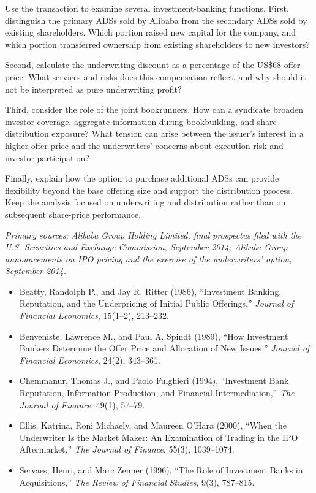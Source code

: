 Use the transaction to examine several investment-banking functions. First, distinguish the primary ADSs sold by Alibaba from the secondary ADSs sold by existing shareholders. Which portion raised new capital for the company, and which portion transferred ownership from existing shareholders to new investors?

Second, calculate the underwriting discount as a percentage of the US\$68 offer price. What services and risks does this compensation reflect, and why should it not be interpreted as pure underwriting profit?

Third, consider the role of the joint bookrunners. How can a syndicate broaden investor coverage, aggregate information during bookbuilding, and share distribution exposure? What tension can arise between the issuer's interest in a higher offer price and the underwriters' concerns about execution risk and investor participation?

Finally, explain how the option to purchase additional ADSs can provide flexibility beyond the base offering size and support the distribution process. Keep the analysis focused on underwriting and distribution rather than on subsequent share-price performance.

\emph{Primary sources: Alibaba Group Holding Limited, final prospectus filed with the U.S. Securities and Exchange Commission, September 2014; Alibaba Group announcements on IPO pricing and the exercise of the underwriters' option, September 2014.}



\begin{itemize}

\item Beatty, Randolph P., and Jay R. Ritter (1986),
``Investment Banking, Reputation, and the Underpricing of Initial Public Offerings,''
\emph{Journal of Financial Economics}, 15(1--2), 213--232.

\item Benveniste, Lawrence M., and Paul A. Spindt (1989),
``How Investment Bankers Determine the Offer Price and Allocation of New Issues,''
\emph{Journal of Financial Economics}, 24(2), 343--361.

\item Chemmanur, Thomas J., and Paolo Fulghieri (1994),
``Investment Bank Reputation, Information Production, and Financial Intermediation,''
\emph{The Journal of Finance}, 49(1), 57--79.

\item Ellis, Katrina, Roni Michaely, and Maureen O'Hara (2000),
``When the Underwriter Is the Market Maker: An Examination of Trading in the IPO Aftermarket,''
\emph{The Journal of Finance}, 55(3), 1039--1074.

\item Servaes, Henri, and Marc Zenner (1996),
``The Role of Investment Banks in Acquisitions,''
\emph{The Review of Financial Studies}, 9(3), 787--815.

\end{itemize}

